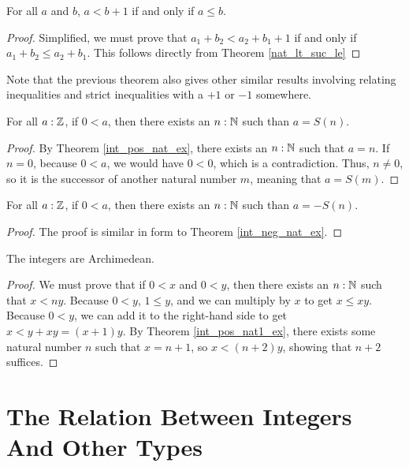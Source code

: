 \documentclass[../../math.tex]{subfiles}
\begin{document}
\begin{theorem} \label{int_lt_suc_le} \label{int_le_suc_lt}
        \label{int_le_pre_lt} \label{int_lt_pre_le}
    For all $a$ and $b$, $a < b + 1$ if and only if $a \leq b$.
\end{theorem}
\begin{proof}
    Simplified, we must prove that $a_1 + b_2 < a_2 + b_1 + 1$ if and only if
    $a_1 + b_2 \leq a_2 + b_1$.  This follows directly from Theorem
    \ref{nat_lt_suc_le}
\end{proof}

Note that the previous theorem also gives other similar results involving
relating inequalities and strict inequalities with a $+ 1$ or $-1$ somewhere.

\begin{theorem} \label{int_pos_nat1_ex}
    For all $a : \mathbb{Z}$, if $0 < a$, then there exists an $n : \mathbb{N}$ such than $a =
    S(n)$.
\end{theorem}
\begin{proof}
    By Theorem \ref{int_pos_nat_ex}, there exists an $n : \mathbb{N}$ such that $a = n$.
    If $n = 0$, because $0 < a$, we would have $0 < 0$, which is a
    contradiction.  Thus, $n \neq 0$, so it is the successor of another natural
    number $m$, meaning that $a = S(m)$.
\end{proof}

\begin{theorem} \label{int_neg_nat1_ex}
    For all $a : \mathbb{Z}$, if $0 < a$, then there exists an $n : \mathbb{N}$ such than $a =
    -S(n)$.
\end{theorem}
\begin{proof}
    The proof is similar in form to Theorem \ref{int_neg_nat_ex}.
\end{proof}

\begin{instance}
    The integers are Archimedean.
\end{instance}
\begin{proof}
    We must prove that if $0 < x$ and $0 < y$, then there exists an $n : \mathbb{N}$
    such that $x < ny$.  Because $0 < y$, $1 \leq y$, and we can multiply by $x$
    to get $x \leq xy$.  Because $0 < y$, we can add it to the right-hand side
    to get $x < y + xy = (x + 1)y$.  By Theorem \ref{int_pos_nat1_ex}, there
    exists some natural number $n$ such that $x = n + 1$, so $x < (n + 2)y$,
    showing that $n + 2$ suffices.
\end{proof}

\section{The Relation Between Integers And Other Types}
\end{document}
